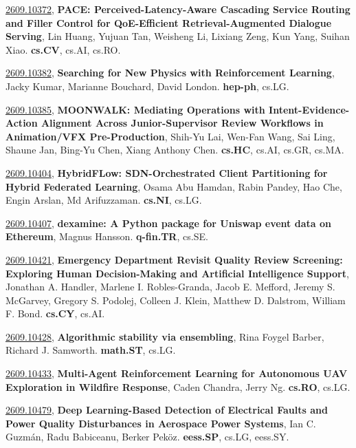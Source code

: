 \documentclass[9pt, a4paper]{article}
\theoremstyle{plain}
\theoremstyle{definition}
\theoremstyle{remark}
\newcommand{\arxivwithtarget}[3]{\hypertarget{#1}{}\href{https://arxiv.org/abs/#1}{#1}, \textbf{\textcolor{arxivblue}{#2}}, #3. }
\begin{document}
\arxivwithtarget{2609.10372}{PACE: Perceived-Latency-Aware Cascading Service Routing and Filler Control for QoE-Efficient Retrieval-Augmented Dialogue Serving}{Lin Huang, Yujuan Tan, Weisheng Li, Lixiang Zeng, Kun Yang, Suihan Xiao}\textbf{cs.CV}, cs.AI, cs.RO.



\arxivwithtarget{2609.10382}{Searching for New Physics with Reinforcement Learning}{Jacky Kumar, Marianne Bouchard, David London}\textbf{hep-ph}, cs.LG.



\arxivwithtarget{2609.10385}{MOONWALK: Mediating Operations with Intent-Evidence-Action Alignment Across Junior-Supervisor Review Workflows in Animation/VFX Pre-Production}{Shih-Yu Lai, Wen-Fan Wang, Sai Ling, Shaune Jan, Bing-Yu Chen, Xiang Anthony Chen}\textbf{cs.HC}, cs.AI, cs.GR, cs.MA.



\arxivwithtarget{2609.10404}{HybridFLow: SDN-Orchestrated Client Partitioning for Hybrid Federated Learning}{Osama Abu Hamdan, Rabin Pandey, Hao Che, Engin Arslan, Md Arifuzzaman}\textbf{cs.NI}, cs.LG.



\arxivwithtarget{2609.10407}{dexamine: A Python package for Uniswap event data on Ethereum}{Magnus Hansson}\textbf{q-fin.TR}, cs.SE.



\arxivwithtarget{2609.10421}{Emergency Department Revisit Quality Review Screening: Exploring Human Decision-Making and Artificial Intelligence Support}{Jonathan A. Handler, Marlene I. Robles-Granda, Jacob E. Mefford, Jeremy S. McGarvey, Gregory S. Podolej, Colleen J. Klein, Matthew D. Dalstrom, William F. Bond}\textbf{cs.CY}, cs.AI.



\arxivwithtarget{2609.10428}{Algorithmic stability via ensembling}{Rina Foygel Barber, Richard J. Samworth}\textbf{math.ST}, cs.LG.



\arxivwithtarget{2609.10433}{Multi-Agent Reinforcement Learning for Autonomous UAV Exploration in Wildfire Response}{Caden Chandra, Jerry Ng}\textbf{cs.RO}, cs.LG.



\arxivwithtarget{2609.10479}{Deep Learning-Based Detection of Electrical Faults and Power Quality Disturbances in Aerospace Power Systems}{Ian C. Guzmán, Radu Babiceanu, Berker Peköz}\textbf{eess.SP}, cs.LG, eess.SY.
\end{document}
